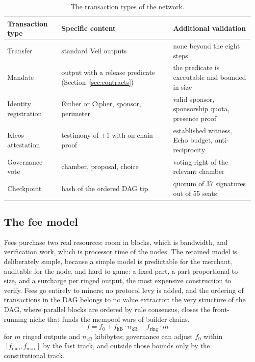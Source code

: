 \begin{table}[htbp]
\centering
\small
\caption{The transaction types of the network.}
\label{tab:txtypes}
\begin{tabularx}{\textwidth}{@{}L{3.6cm}YY@{}}
\toprule
Transaction type & Specific content & Additional validation \\
\midrule
Transfer & standard Veil outputs & none beyond the eight steps \\
Mandate & output with a release predicate (Section~\ref{sec:contracts}) & the predicate is executable and bounded in size \\
Identity registration & Ember or Cipher, sponsor, perimeter & valid sponsor, sponsorship quota, presence proof \\
Kleos attestation & testimony of $\pm 1$ with on-chain proof & established witness, Echo budget, anti-reciprocity \\
Governance vote & chamber, proposal, choice & voting right of the relevant chamber \\
Checkpoint & hash of the ordered DAG tip & quorum of 37 signatures out of 55 seats \\
\bottomrule
\end{tabularx}
\end{table}

\subsection{The fee model}

Fees purchase two real resources: room in blocks, which is bandwidth, and
verification work, which is processor time of the nodes. The retained
model is deliberately simple, because a simple model is predictable for
the merchant, auditable for the node, and hard to game: a fixed part, a
part proportional to size, and a surcharge per ringed output, the most
expensive construction to verify. Fees go entirely to miners; no protocol
levy is added, and the ordering of transactions in the DAG belongs to no
value extractor: the very structure of the DAG, where parallel blocks are
ordered by rule consensus, closes the front-running niche that funds the
mempool wars of builder chains.
\begin{equation}\label{eq:fees}
f = f_0 + f_{\mathrm{kB}} \cdot n_{\mathrm{kB}} + f_{\mathrm{ring}} \cdot m
\end{equation}
for $m$ ringed outputs and $n_{\mathrm{kB}}$ kibibytes; governance can
adjust $f_0$ within $[f_{\min}, f_{\max}]$ by the fast track, and outside
those bounds only by the constitutional track.

